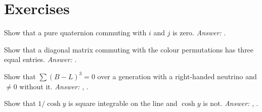 \section*{Exercises}
\begin{exercise}Show that a pure quaternion commuting with $i$ and $j$ is zero. \emph{Answer:} .\end{exercise}
\begin{exercise}Show that a diagonal matrix commuting with the colour permutations has three equal entries. \emph{Answer:} .\end{exercise}
\begin{exercise}Show that $\sum(B-L)^3=0$ over a generation with a right-handed neutrino and $\ne0$ without it. \emph{Answer:} , .\end{exercise}
\begin{exercise}Show that $1/\cosh y$ is square integrable on the line and $\cosh y$ is not. \emph{Answer:} , .\end{exercise}
